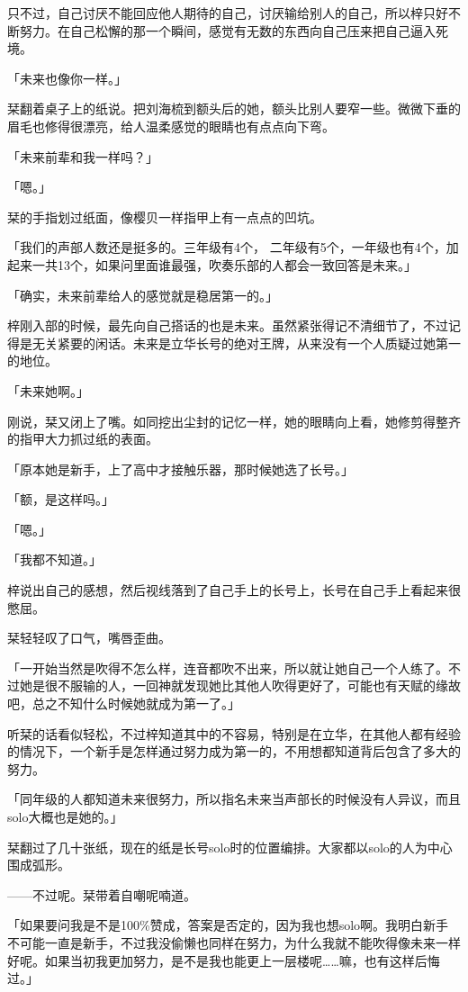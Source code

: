 \documentclass[UTF8]{ctexart}
\begin{document}
    只不过，自己讨厌不能回应他人期待的自己，讨厌输给别人的自己，所以梓只好不断努力。在自己松懈的那一个瞬间，感觉有无数的东西向自己压来把自己逼入死境。

    「未来也像你一样。」

    栞翻着桌子上的纸说。把刘海梳到额头后的她，额头比别人要窄一些。微微下垂的眉毛也修得很漂亮，给人温柔感觉的眼睛也有点点向下弯。

    「未来前辈和我一样吗？」

    「嗯。」

    栞的手指划过纸面，像樱贝一样指甲上有一点点的凹坑。

    「我们的声部人数还是挺多的。三年级有4个， 二年级有5个，一年级也有4个，加起来一共13个，如果问里面谁最强，吹奏乐部的人都会一致回答是未来。」

    「确实，未来前辈给人的感觉就是稳居第一的。」

    梓刚入部的时候，最先向自己搭话的也是未来。虽然紧张得记不清细节了，不过记得是无关紧要的闲话。未来是立华长号的绝对王牌，从来没有一个人质疑过她第一的地位。

    「未来她啊。」

    刚说，栞又闭上了嘴。如同挖出尘封的记忆一样，她的眼睛向上看，她修剪得整齐的指甲大力抓过纸的表面。

    「原本她是新手，上了高中才接触乐器，那时候她选了长号。」

    「额，是这样吗。」

    「嗯。」

    「我都不知道。」

    梓说出自己的感想，然后视线落到了自己手上的长号上，长号在自己手上看起来很憋屈。

    栞轻轻叹了口气，嘴唇歪曲。

    「一开始当然是吹得不怎么样，连音都吹不出来，所以就让她自己一个人练了。不过她是很不服输的人，一回神就发现她比其他人吹得更好了，可能也有天赋的缘故吧，总之不知什么时候她就成为第一了。」

    听栞的话看似轻松，不过梓知道其中的不容易，特别是在立华，在其他人都有经验的情况下，一个新手是怎样通过努力成为第一的，不用想都知道背后包含了多大的努力。

    「同年级的人都知道未来很努力，所以指名未来当声部长的时候没有人异议，而且solo大概也是她的。」

    栞翻过了几十张纸，现在的纸是长号solo时的位置编排。大家都以solo的人为中心围成弧形。

    ——不过呢。栞带着自嘲呢喃道。

    「如果要问我是不是100\%赞成，答案是否定的，因为我也想solo啊。我明白新手不可能一直是新手，不过我没偷懒也同样在努力，为什么我就不能吹得像未来一样好呢。如果当初我更加努力，是不是我也能更上一层楼呢……嘛，也有这样后悔过。」
\end{document}

